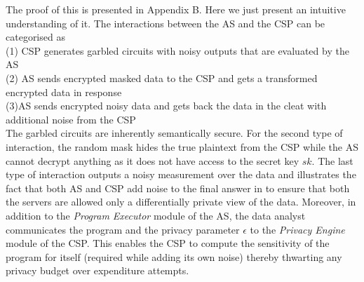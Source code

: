 The proof of this is presented in Appendix B. Here we just present an intuitive understanding of it. The interactions between the \textsf{AS} and the \textsf{CSP} can be categorised as \\(1) \textsf{CSP} generates garbled circuits with noisy outputs that are evaluated by the \textsf{AS}\\(2) \textsf{AS} sends encrypted masked data to the \textsf{CSP} and gets a transformed encrypted data in response \\(3)\textsf{AS} sends encrypted noisy data and gets back the data in the cleat with additional noise from the \textsf{CSP}\\
The garbled circuits are inherently semantically secure. For the second type of interaction, the random
mask hides the true plaintext
from the \textsf{CSP} while the \textsf{AS} cannot decrypt anything as it does not have access to the secret key $sk$. The last type of interaction outputs a noisy measurement over the data and illustrates the fact that both  \textsf{AS} and \textsf{CSP} add noise to the final answer in \system to ensure that both the servers are allowed only a differentially private  view of the data. Moreover, in
addition to the \emph{Program Executor} module of the \textsf{AS}, the data analyst
communicates the \system program and the privacy parameter $\epsilon$
to the \textit{Privacy Engine} module of the \textsf{CSP}. This enables the \textsf{CSP} to
compute the sensitivity of the program for itself (required while
adding its own noise) thereby thwarting any privacy budget over
expenditure attempts.


